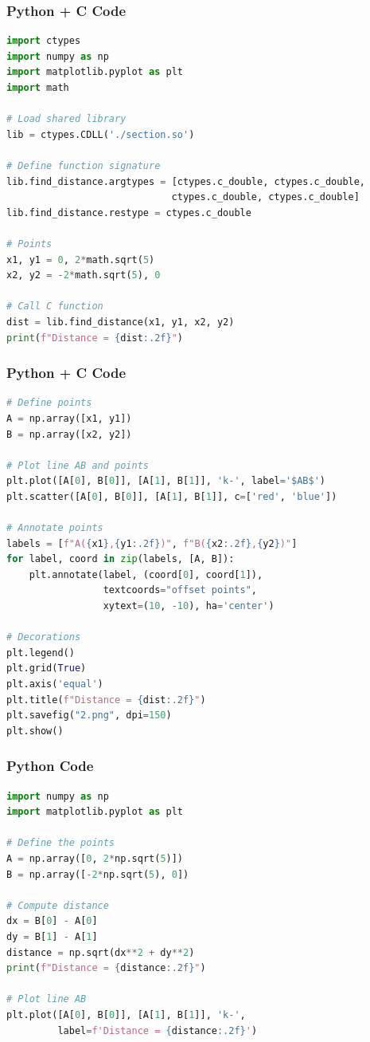 \documentclass{beamer}
\begin{document}
\begin{frame}[fragile]
    \frametitle{Python + C Code}
    \begin{lstlisting}[language=Python]
import ctypes
import numpy as np
import matplotlib.pyplot as plt
import math

# Load shared library
lib = ctypes.CDLL('./section.so')

# Define function signature
lib.find_distance.argtypes = [ctypes.c_double, ctypes.c_double,
                             ctypes.c_double, ctypes.c_double]
lib.find_distance.restype = ctypes.c_double

# Points
x1, y1 = 0, 2*math.sqrt(5)
x2, y2 = -2*math.sqrt(5), 0

# Call C function
dist = lib.find_distance(x1, y1, x2, y2)
print(f"Distance = {dist:.2f}")
    \end{lstlisting}
\end{frame}

\begin{frame}[fragile]
    \frametitle{Python + C Code}
    \begin{lstlisting}[language=Python]
# Define points
A = np.array([x1, y1])
B = np.array([x2, y2])

# Plot line AB and points
plt.plot([A[0], B[0]], [A[1], B[1]], 'k-', label='$AB$')
plt.scatter([A[0], B[0]], [A[1], B[1]], c=['red', 'blue'])

# Annotate points
labels = [f"A({x1},{y1:.2f})", f"B({x2:.2f},{y2})"]
for label, coord in zip(labels, [A, B]):
    plt.annotate(label, (coord[0], coord[1]),
                 textcoords="offset points",
                 xytext=(10, -10), ha='center')

# Decorations
plt.legend()
plt.grid(True)
plt.axis('equal')
plt.title(f"Distance = {dist:.2f}")
plt.savefig("2.png", dpi=150)
plt.show()
    \end{lstlisting}
\end{frame}

\begin{frame}[fragile]
    \frametitle{Python Code}
    \begin{lstlisting}[language=Python]
import numpy as np
import matplotlib.pyplot as plt

# Define the points
A = np.array([0, 2*np.sqrt(5)])
B = np.array([-2*np.sqrt(5), 0])

# Compute distance
dx = B[0] - A[0]
dy = B[1] - A[1]
distance = np.sqrt(dx**2 + dy**2)
print(f"Distance = {distance:.2f}")

# Plot line AB
plt.plot([A[0], B[0]], [A[1], B[1]], 'k-',
         label=f'Distance = {distance:.2f}')
    \end{lstlisting}
\end{frame}
\end{document}
